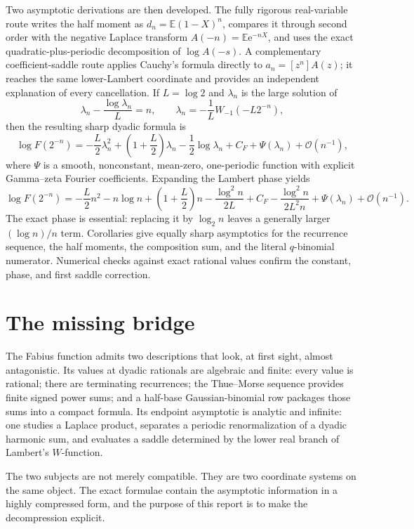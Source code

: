\documentclass[11pt,oneside]{article}
\theoremstyle{definition}
\theoremstyle{remark}
\newcommand{\e}{\mathrm e}
\newcommand{\E}{\mathbb E}
\newcommand{\bigO}{\mathcal O}
\begin{document}
Two asymptotic derivations are then developed.  The fully rigorous real-variable route writes
the half moment as $d_n=\E(1-X)^n$, compares it through second order with the negative
Laplace transform $A(-n)=\E\e^{-nX}$, and uses the exact quadratic-plus-periodic
decomposition of $\log A(-s)$.  A complementary coefficient-saddle route applies Cauchy's
formula directly to $a_n=[z^n]A(z)$; it reaches the same lower-Lambert coordinate and provides
an independent explanation of every cancellation.  If $L=\log2$ and $\lambda_n$ is the
large solution of
\[
 \lambda_n-\frac{\log\lambda_n}{L}=n,
 \qquad
 \lambda_n=-\frac1L W_{-1}(-L2^{-n}),
\]
then the resulting sharp dyadic formula is
\[
 \log F(2^{-n})=
 -\frac L2\lambda_n^2+
 \left(1+\frac L2\right)\lambda_n-\frac12\log\lambda_n
 +C_F+\Psi(\lambda_n)+\bigO(n^{-1}),
\]
where $\Psi$ is a smooth, nonconstant, mean-zero, one-periodic function with explicit
Gamma--zeta Fourier coefficients.  Expanding the Lambert phase yields
\[
 \log F(2^{-n})=
 -\frac L2n^2-n\log n+\left(1+\frac L2\right)n
 -\frac{\log^2n}{2L}+C_F-
 \frac{\log^2n}{2L^2n}+\Psi(\lambda_n)+\bigO(n^{-1}).
\]
The exact phase is essential: replacing it by $\log_2n$ leaves a generally larger
$(\log n)/n$ term.  Corollaries give equally sharp asymptotics for the recurrence sequence,
the half moments, the composition sum, and the literal $q$-binomial numerator.  Numerical
checks against exact rational values confirm the constant, phase, and first saddle
correction.


\section{The missing bridge}
\label{dyadicasym:sec:introduction}

The Fabius function admits two descriptions that look, at first sight, almost antagonistic.
Its values at dyadic rationals are algebraic and finite: every value is rational; there are
terminating recurrences; the Thue--Morse sequence provides finite signed power sums; and a
half-base Gaussian-binomial row packages those sums into a compact formula.  Its endpoint
asymptotic is analytic and infinite: one studies a Laplace product, separates a periodic
renormalization of a dyadic harmonic sum, and evaluates a saddle determined by the lower real
branch of Lambert's $W$-function.

The two subjects are not merely compatible.  They are two coordinate systems on the same
object.  The exact formulae contain the asymptotic information in a highly compressed form,
and the purpose of this report is to make the decompression explicit.
\end{document}
